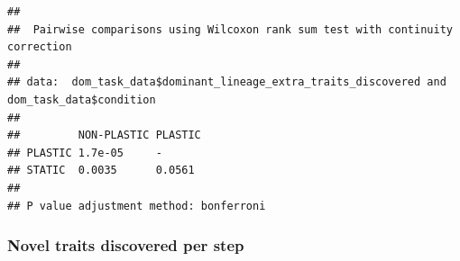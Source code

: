 \documentclass[]{book}
\newenvironment{Shaded}{\begin{snugshade}}{\end{snugshade}}
\newcommand{\DataTypeTok}[1]{\textcolor[rgb]{0.13,0.29,0.53}{#1}}
\newcommand{\FloatTok}[1]{\textcolor[rgb]{0.00,0.00,0.81}{#1}}
\newcommand{\KeywordTok}[1]{\textcolor[rgb]{0.13,0.29,0.53}{\textbf{#1}}}
\newcommand{\NormalTok}[1]{#1}
\newcommand{\OperatorTok}[1]{\textcolor[rgb]{0.81,0.36,0.00}{\textbf{#1}}}
\newcommand{\OtherTok}[1]{\textcolor[rgb]{0.56,0.35,0.01}{#1}}
\newcommand{\StringTok}[1]{\textcolor[rgb]{0.31,0.60,0.02}{#1}}
\begin{document}
\begin{Shaded}
\end{Shaded}

\begin{verbatim}
## 
##  Pairwise comparisons using Wilcoxon rank sum test with continuity correction 
## 
## data:  dom_task_data$dominant_lineage_extra_traits_discovered and dom_task_data$condition 
## 
##         NON-PLASTIC PLASTIC
## PLASTIC 1.7e-05     -      
## STATIC  0.0035      0.0561 
## 
## P value adjustment method: bonferroni
\end{verbatim}

\hypertarget{novel-traits-discovered-per-step}{%
\subsubsection{Novel traits discovered per step}\label{novel-traits-discovered-per-step}}
\end{document}
